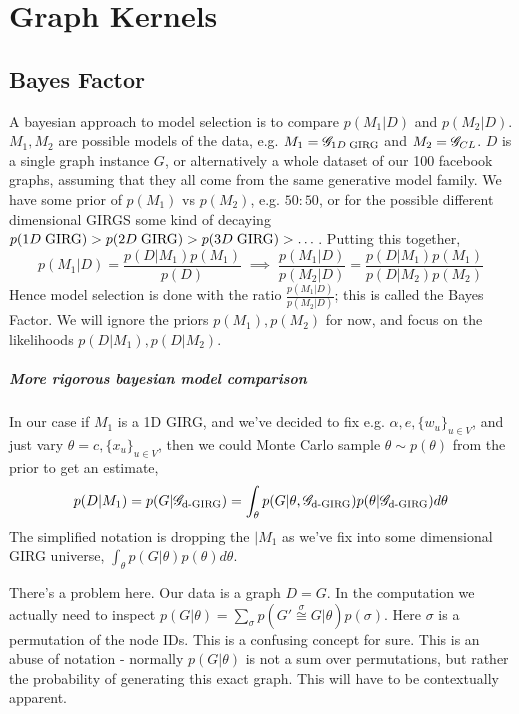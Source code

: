 \chapter{Graph Kernels}
\label{chap:graph_kernels}
\minitoc

\section{Bayes Factor}
A bayesian approach to model selection is to compare $p(M_1 | D)$ and $p(M_2 | D)$. $M_1, M_2$ are possible models of the data, e.g. $M_1 = \mathscr{G}_{1D\; \mathrm{GIRG}}$ and $M_2 = \mathscr{G}_{CL}$. $D$ is a single graph instance $G$, or alternatively a whole dataset of our 100 facebook graphs, assuming that they all come from the same generative model family. We have some prior of $p(M_1)$ vs $p(M_2)$, e.g. $50 : 50$, or for the possible different dimensional GIRGS some kind of decaying $p(1D\; \mathrm{GIRG}) > p(2D\; \mathrm{GIRG}) > p(3D\; \mathrm{GIRG}) > \dots$.
Putting this together,
\begin{equation}
  p(M_1 | D) = \frac{p(D | M_1) p(M_1)}{p(D)} 
  \;
  \implies
  \;
  \frac{p(M_1 | D)}{p(M_2 | D)} = \frac{p(D | M_1) p(M_1)}{p(D | M_2) p(M_2)}
\end{equation}
Hence model selection is done with the ratio $\frac{p(M_1 | D)}{p(M_2 | D)}$; this is called the Bayes Factor.
We will ignore the priors $p(M_1), p(M_2)$ for now, and focus on the likelihoods $p(D | M_1), p(D | M_2)$.



\paragraph{More rigorous bayesian model comparison}
In our case if $M_1$ is a 1D GIRG, and we've decided to fix e.g. $\alpha, e, \{w_u\}_{u \in V}$, and just vary $\theta = c, \{x_u\}_{u \in V}$, then we could Monte Carlo sample $\theta \sim p(\theta)$ from the prior to get an estimate, 
\begin{equation} \label{eq:incorrect_girg_model_likelihood}
  p(D| M_1) = p(G | \mathscr{G}_{\text{d-}\mathrm{GIRG}}) = \int_\theta p(G | \theta, \mathscr{G}_{\text{d-}\mathrm{GIRG}}) p(\theta | \mathscr{G}_{\text{d-}\mathrm{GIRG}}) d\theta
\end{equation}
The simplified notation is dropping the $| M_1$ as we've fix into some dimensional GIRG universe, $\int_\theta p(G | \theta) p(\theta) d\theta$.

There's a problem here. Our data is a graph $D=G$. In the computation we actually need to inspect $p(G | \theta) = \sum_{\sigma} p(G' \stackrel{\sigma}{\cong} G | \theta) p(\sigma)$. Here $\sigma$ is a permutation of the node IDs. This is a confusing concept for sure. This is an abuse of notation - normally $p(G | \theta)$ is not a sum over permutations, but rather the probability of generating this exact graph. This will have to be contextually apparent.

